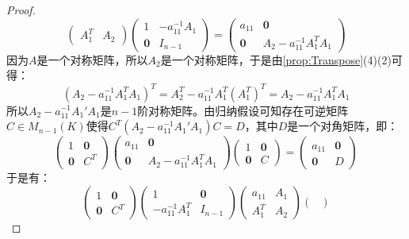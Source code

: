 \begin{proof}
\begin{equation*}
\begin{pmatrix}
			A_1^T & A_2
		\end{pmatrix}
		\begin{pmatrix}
			1 & -a_{11}^{-1}A_1 \\
			\mathbf{0} & I_{n-1}
		\end{pmatrix}
		=
		\begin{pmatrix}
			a_{11} & \mathbf{0} \\
			\mathbf{0} & A_2-a_{11}^{-1}A_1^TA_1
		\end{pmatrix}
	\end{equation*}
	因为$A$是一个对称矩阵，所以$A_2$是一个对称矩阵，于是由\cref{prop:Transpose}(4)(2)可得：
	\begin{equation*}
		(A_2-a_{11}^{-1}A_1^TA_1)^T=A_2^T-a_{11}^{-1}A_1^T(A_1^T)^T=A_2-a_{11}^{-1}A_1^TA_1
	\end{equation*}
	所以$A_2-a_{11}^{-1}A_1'A_1$是$n-1$阶对称矩阵。由归纳假设可知存在可逆矩阵$C\in M_{n-1}(K)$使得$C^T(A_2-a_{11}^{-1}A_1'A_1)C=D$，其中$D$是一个对角矩阵，即：
	\begin{equation*}
		\begin{pmatrix}
			1 & \mathbf{0} \\
			\mathbf{0} & C^T
		\end{pmatrix}
		\begin{pmatrix}
			a_{11} & \mathbf{0} \\
			\mathbf{0} & A_2-a_{11}^{-1}A_1^TA_1
		\end{pmatrix}
		\begin{pmatrix}
		1 & \mathbf{0} \\
		\mathbf{0} & C
		\end{pmatrix}
		=
		\begin{pmatrix}
			a_{11} & \mathbf{0} \\
			\mathbf{0} & D
		\end{pmatrix}
	\end{equation*}
	于是有：
	\begin{equation*}
		\begin{pmatrix}
			1 & \mathbf{0} \\
			\mathbf{0} & C^T
		\end{pmatrix}
		\begin{pmatrix}
			1 & \mathbf{0} \\
			-a_{11}^{-1}A_1^T & I_{n-1}
		\end{pmatrix}
		\begin{pmatrix}
			a_{11} & A_1 \\
			A_1^T & A_2
		\end{pmatrix}
		\begin{pmatrix}

\end{pmatrix}
\end{equation*}
\end{proof}
